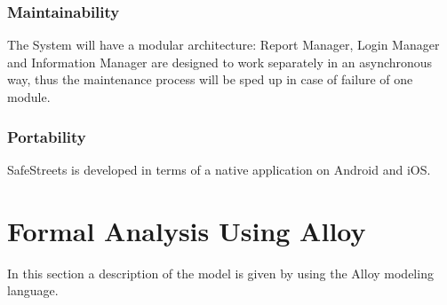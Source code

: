 \documentclass{report}
\begin{document}
\subsection{Maintainability}
The System will have a modular architecture: Report Manager, Login Manager and Information Manager are designed to work separately in an asynchronous way, thus the maintenance process will be sped up in case of failure of one module.
\subsection{Portability}
SafeStreets is developed in terms of a native application on Android and iOS.

\chapter{Formal Analysis Using Alloy}
In this section a description of the model is given by using the Alloy modeling language.
\end{document}
